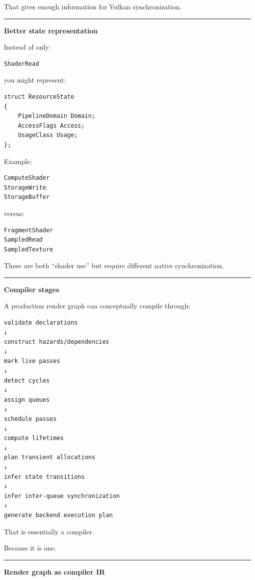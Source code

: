 That gives enough information for Vulkan synchronization.

\begin{center}\rule{0.5\linewidth}{0.5pt}\end{center}

\textbf{Better state representation}

Instead of only:

\begin{verbatim}
ShaderRead
\end{verbatim}

you might represent:

\begin{verbatim}
struct ResourceState
{
    PipelineDomain Domain;
    AccessFlags Access;
    UsageClass Usage;
};
\end{verbatim}

Example:

\begin{verbatim}
ComputeShader
StorageWrite
StorageBuffer
\end{verbatim}

versus:

\begin{verbatim}
FragmentShader
SampledRead
SampledTexture
\end{verbatim}

These are both ``shader use'' but require different native synchronization.

\begin{center}\rule{0.5\linewidth}{0.5pt}\end{center}

\textbf{Compiler stages}

A production render graph can conceptually compile through:

\begin{verbatim}
validate declarations
↓
construct hazards/dependencies
↓
mark live passes
↓
detect cycles
↓
assign queues
↓
schedule passes
↓
compute lifetimes
↓
plan transient allocations
↓
infer state transitions
↓
infer inter-queue synchronization
↓
generate backend execution plan
\end{verbatim}

That is essentially a compiler.

Because it is one.

\begin{center}\rule{0.5\linewidth}{0.5pt}\end{center}

\textbf{Render graph as compiler IR}

